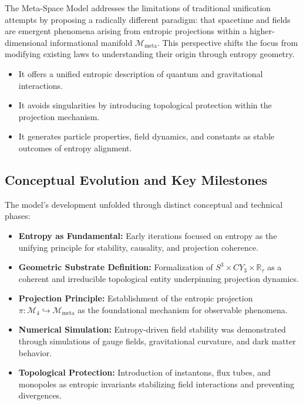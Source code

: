 \documentclass[10.5pt,a4paper]{article}
\begin{document}
The Meta-Space Model addresses the limitations of traditional unification attempts by proposing a radically different paradigm: that spacetime and fields are emergent phenomena arising from entropic projections within a higher-dimensional informational manifold \( \mathcal{M}_{\text{meta}} \). This perspective shifts the focus from modifying existing laws to understanding their origin through entropy geometry.

\begin{itemize}
    \item It offers a unified entropic description of quantum and gravitational interactions.
    \item It avoids singularities by introducing topological protection within the projection mechanism.
    \item It generates particle properties, field dynamics, and constants as stable outcomes of entropy alignment.
\end{itemize}

\subsection{Conceptual Evolution and Key Milestones}

The model's development unfolded through distinct conceptual and technical phases:
\begin{itemize}
    \item \textbf{Entropy as Fundamental:} Early iterations focused on entropy as the unifying principle for stability, causality, and projection coherence.
    
    \item \textbf{Geometric Substrate Definition:} Formalization of \( S^3 \times CY_3 \times \mathbb{R}_\tau \) as a coherent and irreducible topological entity underpinning projection dynamics.
    
    \item \textbf{Projection Principle:} Establishment of the entropic projection \( \pi: \mathcal{M}_4 \hookrightarrow \mathcal{M}_{\text{meta}} \) as the foundational mechanism for observable phenomena.
    
    \item \textbf{Numerical Simulation:} Entropy-driven field stability was demonstrated through simulations of gauge fields, gravitational curvature, and dark matter behavior.
    
    \item \textbf{Topological Protection:} Introduction of instantons, flux tubes, and monopoles as entropic invariants stabilizing field interactions and preventing divergences.
\end{itemize}
\end{document}
